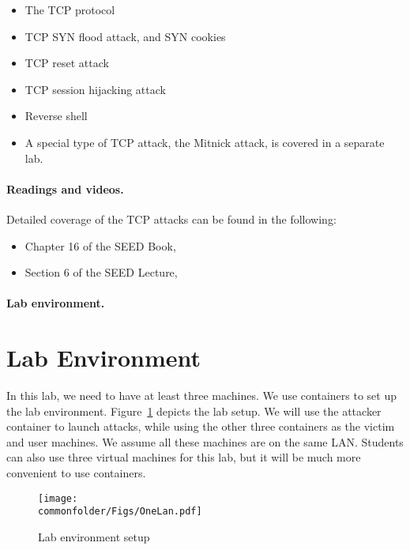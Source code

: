 \begin{itemize}[noitemsep]
\item The TCP protocol
\item TCP SYN flood attack, and SYN cookies 
\item TCP reset attack
\item TCP session hijacking attack
\item Reverse shell 
\item A special type of TCP attack, the Mitnick attack, is covered 
in a separate lab. 
\end{itemize}


\paragraph{Readings and videos.}
Detailed coverage of the TCP attacks can be found in the following:

\begin{itemize}
\item Chapter 16 of the SEED Book, \seedbook
\item Section 6 of the SEED Lecture, \seedisvideo
\end{itemize}


\paragraph{Lab environment.} \seedenvironmentC



\section{Lab Environment}


In this lab, we need to have at least three machines. We use 
containers to set up the lab environment. Figure~\ref{tcp:fig:labsetup}
depicts the lab setup. 
We will use the attacker container to launch attacks, while using the other 
three containers as the victim and user machines. 
We assume all these machines are on the same LAN. 
Students can also use three virtual machines for this lab, 
but it will be much more convenient to use containers. 


\begin{figure}[htb]
\begin{center}
\texttt{[image: \\commonfolder/Figs/OneLan.pdf]}
\end{center}
\caption{Lab environment setup}
\label{tcp:fig:labsetup}
\end{figure}
 

